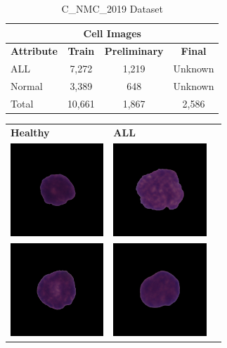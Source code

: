 \documentclass[
	a4paper,
	10pt,
	unnumberedsections,
	twoside,
]{research_article}
\begin{document}
\begin{table}[ht]
	\caption{C\_NMC\_2019 Dataset}
	\centering
	\label{tab:datasets}
	\begin{tabular}{lccc}
		\multicolumn{4}{c}{Cell Images} \\
		\hline
		\textbf{Attribute} & \textbf{Train} & \textbf{Preliminary} & \textbf{Final} \\
		\hline
		ALL & 7,272 & 1,219 & Unknown \\
		Normal & 3,389 & 648 & Unknown \\
		Total & 10,661 & 1,867 & 2,586 \\
		\hline
	\end{tabular}
\end{table}

\begin{tabular}{m{3.25cm} m{4cm} m{4cm}}
	\textbf{Healthy} & \textbf{ALL} \\
	\includegraphics[width=3.5cm]{images/UID_H10_103_3_hem.png} & \includegraphics[width=3.5cm]{images/UID_11_16_2_all.png} \\
	\includegraphics[width=3.5cm]{images/UID_H10_100_3_hem.png} & \includegraphics[width=3.5cm]{images/UID_11_2_1_all.png} \\

\end{tabular}
\end{document}

